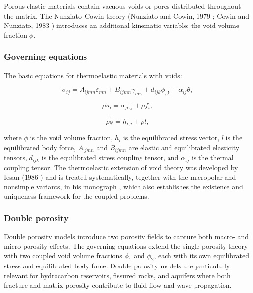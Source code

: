 Porous elastic materials contain vacuous voids or pores distributed throughout the matrix. The Nunziato--Cowin theory (Nunziato and Cowin, 1979 \cite{Nunziato1979}; Cowin and Nunziato, 1983 \cite{Cowin1983}) introduces an additional kinematic variable: the void volume fraction $\phi$.

\subsubsection{Governing equations}

The basic equations for thermoelastic materials with voids:

\begin{equation}
\sigma_{ij} = A_{ijmn}\varepsilon_{mn} + B_{ijmn}\gamma_{mn} + d_{ijk}\phi_{,k} - \alpha_{ij}\theta,
\label{eq:5.14}
\end{equation}

\begin{equation}
\rho\ddot{u}_i = \sigma_{ji,j} + \rho f_i,
\label{eq:5.15}
\end{equation}

\begin{equation}
\rho\ddot{\phi} = h_{i,i} + \rho l,
\label{eq:5.16}
\end{equation}

where $\phi$ is the void volume fraction, $h_i$ is the equilibrated stress vector, $l$ is the equilibrated body force, $A_{ijmn}$ and $B_{ijmn}$ are elastic and equilibrated elasticity tensors, $d_{ijk}$ is the equilibrated stress coupling tensor, and $\alpha_{ij}$ is the thermal coupling tensor. The thermoelastic extension of void theory was developed by Iesan (1986 \cite{Iesan1986}) and is treated systematically, together with the micropolar and nonsimple variants, in his monograph \cite{Iesan2013}, which also establishes the existence and uniqueness framework for the coupled problems.

\subsubsection{Double porosity}

Double porosity models introduce two porosity fields to capture both macro- and micro-porosity effects. The governing equations extend the single-porosity theory with two coupled void volume fractions $\phi_1$ and $\phi_2$, each with its own equilibrated stress and equilibrated body force. Double porosity models are particularly relevant for hydrocarbon reservoirs, fissured rocks, and aquifers where both fracture and matrix porosity contribute to fluid flow and wave propagation.

